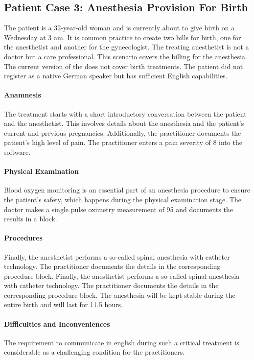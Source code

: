 \subsection{Patient Case 3: Anesthesia Provision For Birth}\label{subsec:patient-case-3:-anesthesia-for-birth}
The patient is a 32-year-old woman and is currently about to give birth on a Wednesday at 3 am.
It is common practice to create two bills for birth, one for the anesthetist and another for the gynecologist.
The treating anesthetist is not a doctor but a care professional.
This scenario covers the billing for the anesthesia.
The current version of the \AVS does not cover birth treatments.
The patient did not register as a native German speaker but has sufficient English capabilities.

\paragraph{Anamnesis}
The treatment starts with a short introductory conversation between the patient and the anesthetist.
This involves details about the anesthesia and the patient's current and previous pregnancies.
Additionally, the practitioner documents the patient's high level of pain.
The practitioner enters a pain severity of 8 into the software.

\paragraph{Physical Examination}
Blood oxygen monitoring is an essential part of an anesthesia procedure to ensure the patient's safety, which happens during the physical examination stage.
The doctor makes a single pulse oximetry measurement of 95 and documents the results in a  block.

\paragraph{Procedures}
Finally, the anesthetist performs a so-called spinal anesthesia with catheter technology.
The practitioner documents the details in the corresponding  procedure block.
Finally, the anesthetist performs a so-called spinal anesthesia with catheter technology.
The practitioner documents the details in the corresponding  procedure block.
The anesthesia will be kept stable during the entire birth and will last for 11.5 hours.

\paragraph{Difficulties and Inconveniences}
The requirement to communicate in english during such a critical treatment is considerable as a challenging condition for the practitioners.

